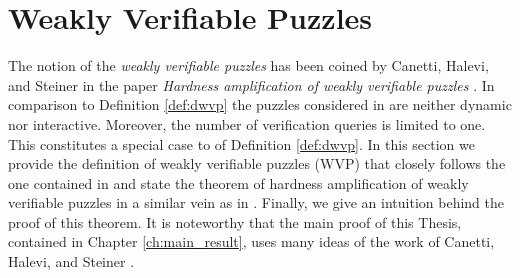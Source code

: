 %
\section{Weakly Verifiable Puzzles}
\label{subsec:chs}
The notion of the \textit{weakly verifiable puzzles} has been coined by Canetti, Halevi, and Steiner in the paper
\textit{Hardness amplification of weakly verifiable puzzles} \cite{canetti2004hardness}.
In comparison to Definition \ref{def:dwvp} the puzzles considered in \cite{canetti2004hardness} are neither dynamic nor interactive.
Moreover, the number of verification queries is limited to one.
This constitutes a special case to of Definition \ref{def:dwvp}.
In this section we provide the definition of weakly verifiable puzzles (WVP) that closely follows the one contained in \cite{canetti2004hardness}
and state the theorem of hardness amplification of weakly verifiable puzzles in a similar vein as in \cite{canetti2004hardness}.
Finally, we give an intuition behind the proof of this theorem.
It is noteworthy that the main proof of this Thesis, contained in Chapter \ref{ch:main_result},
uses many ideas of the work of Canetti, Halevi, and Steiner \cite{canetti2004hardness}.
%
